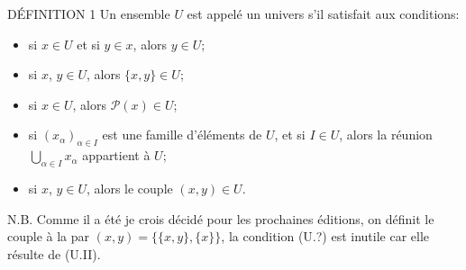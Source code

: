\documentclass[10pt]{../fichiers-configuration-latex/smfart}
\begin{document}
\begin{enonce*}{DÉFINITION 1}
Un ensemble $U$ est appelé un univers s'il satisfait aux conditions:
\begin{itemize}
\item[(U.I)] si $x\in U$ et si $y\in x$, alors $y\in U$;

\item[(U.II)] si $x$, $y\in U$, alors $\{x,y\}\in U$;

\item[(U.III)] si $x\in U$, alors $\mathcal{P}(x)\in U$;

\item[(U.IV)] si $(x_{\alpha})_{\alpha\in I}$ est une famille
d'éléments de $U$, et si $I\in U$, alors la réunion
$\bigcup_{\alpha\in I}x_{\alpha}$ appartient à $U$;

\item[(U.?)] si $x$, $y\in U$, alors le couple $(x,y)\in U$.
\end{itemize}
\end{enonce*}
\noindent N.B. Comme il a été je crois décidé pour les prochaines
éditions, on définit le couple à la 
par $(x,y)=\{\{x,y\}, \{x\}\}$, la condition (U.?) est inutile car
elle résulte de (U.II).
\end{document}
